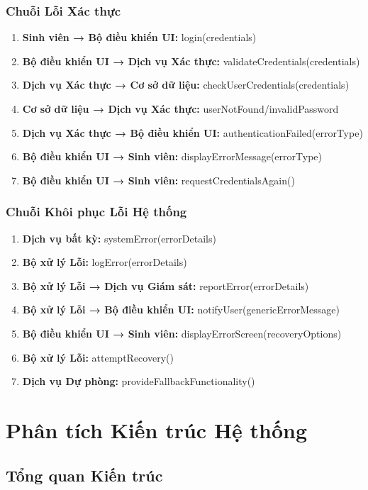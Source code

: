 \subsubsection{Chuỗi Lỗi Xác thực}
\begin{enumerate}
    \item \textbf{Sinh viên → Bộ điều khiển UI:} login(credentials)
    \item \textbf{Bộ điều khiển UI → Dịch vụ Xác thực:} validateCredentials(credentials)
    \item \textbf{Dịch vụ Xác thực → Cơ sở dữ liệu:} checkUserCredentials(credentials)
    \item \textbf{Cơ sở dữ liệu → Dịch vụ Xác thực:} userNotFound/invalidPassword
    \item \textbf{Dịch vụ Xác thực → Bộ điều khiển UI:} authenticationFailed(errorType)
    \item \textbf{Bộ điều khiển UI → Sinh viên:} displayErrorMessage(errorType)
    \item \textbf{Bộ điều khiển UI → Sinh viên:} requestCredentialsAgain()
\end{enumerate}

\subsubsection{Chuỗi Khôi phục Lỗi Hệ thống}
\begin{enumerate}
    \item \textbf{Dịch vụ bất kỳ:} systemError(errorDetails)
    \item \textbf{Bộ xử lý Lỗi:} logError(errorDetails)
    \item \textbf{Bộ xử lý Lỗi → Dịch vụ Giám sát:} reportError(errorDetails)
    \item \textbf{Bộ xử lý Lỗi → Bộ điều khiển UI:} notifyUser(genericErrorMessage)
    \item \textbf{Bộ điều khiển UI → Sinh viên:} displayErrorScreen(recoveryOptions)
    \item \textbf{Bộ xử lý Lỗi:} attemptRecovery()
    \item \textbf{Dịch vụ Dự phòng:} provideFallbackFunctionality()
\end{enumerate}

\section{Phân tích Kiến trúc Hệ thống}
\label{sec:system-architecture}

\subsection{Tổng quan Kiến trúc}
\label{subsec:architecture-overview}


